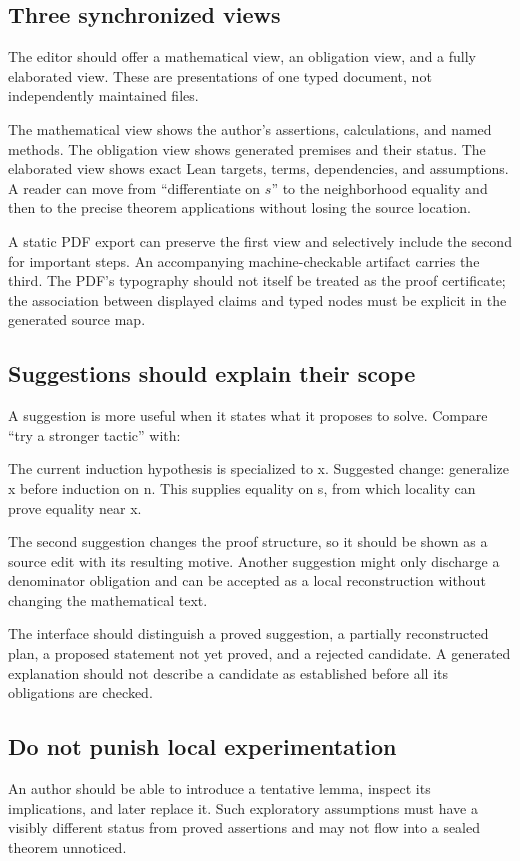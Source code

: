 \documentclass[11pt,a4paper]{article}
\theoremstyle{remark}
\begin{document}
\subsection{Three synchronized views}
The editor should offer a mathematical view, an obligation view, and a fully elaborated view. These are presentations of one typed document, not independently maintained files.

The mathematical view shows the author's assertions, calculations, and named methods. The obligation view shows generated premises and their status. The elaborated view shows exact Lean targets, terms, dependencies, and assumptions. A reader can move from ``differentiate on $s$'' to the neighborhood equality and then to the precise theorem applications without losing the source location.

A static PDF export can preserve the first view and selectively include the second for important steps. An accompanying machine-checkable artifact carries the third. The PDF's typography should not itself be treated as the proof certificate; the association between displayed claims and typed nodes must be explicit in the generated source map.

\subsection{Suggestions should explain their scope}
A suggestion is more useful when it states what it proposes to solve. Compare ``try a stronger tactic'' with:
\Needspace{58pt}
\begin{code}
The current induction hypothesis is specialized to x.
Suggested change: generalize x before induction on n.
This supplies equality on s, from which locality can prove equality near x.
\end{code}
The second suggestion changes the proof structure, so it should be shown as a source edit with its resulting motive. Another suggestion might only discharge a denominator obligation and can be accepted as a local reconstruction without changing the mathematical text.

The interface should distinguish a proved suggestion, a partially reconstructed plan, a proposed statement not yet proved, and a rejected candidate. A generated explanation should not describe a candidate as established before all its obligations are checked.

\subsection{Do not punish local experimentation}
An author should be able to introduce a tentative lemma, inspect its implications, and later replace it. Such exploratory assumptions must have a visibly different status from proved assertions and may not flow into a sealed theorem unnoticed.
\end{document}
